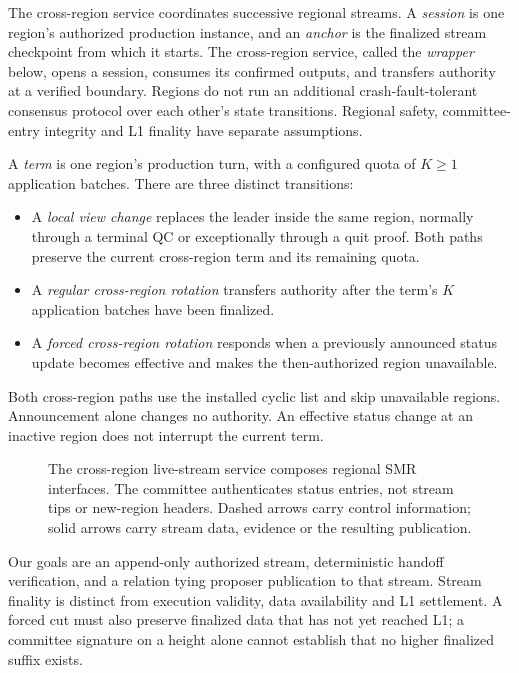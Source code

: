 \documentclass[11pt,a4paper,onecolumn]{article}
\newcounter{protocol}
\begin{document}
The cross-region service coordinates successive regional streams. A
\emph{session} is one region's authorized production instance, and an
\emph{anchor} is the finalized stream checkpoint from which it starts.
The cross-region service, called the \emph{wrapper} below, opens a session,
consumes its confirmed outputs, and transfers authority at a verified
boundary. Regions
do not run an additional crash-fault-tolerant consensus protocol over each
other's state transitions. Regional safety, committee-entry integrity and
L1 finality have separate assumptions.

A \emph{term} is one region's production turn, with a configured quota
of $K\geq1$ application batches. There are three distinct transitions:
\begin{itemize}
\item A \emph{local view change} replaces the leader inside the same region,
normally through a terminal QC or exceptionally through a quit proof.
Both paths preserve the current cross-region term and its remaining quota.
\item A \emph{regular cross-region rotation} transfers authority after
the term's $K$ application batches have been finalized.
\item A \emph{forced cross-region rotation} responds when a previously
announced status update becomes effective and makes the then-authorized
region unavailable.
\end{itemize}
Both cross-region paths use the installed cyclic list and skip unavailable
regions. Announcement alone changes no authority. An effective status
change at an inactive region does not interrupt the current term.

\begin{figure}[htbp]\centering

\caption{The cross-region live-stream service composes regional SMR
interfaces. The committee authenticates status entries, not stream tips or
new-region headers. Dashed arrows carry control information; solid arrows
carry stream data, evidence or the resulting publication.}
\label{fig:architecture}
\end{figure}

Our goals are an append-only authorized stream, deterministic handoff
verification, and a relation tying proposer publication to that stream.
Stream finality is distinct from execution validity, data availability
and L1 settlement. A forced cut must also preserve finalized data that has
not yet reached L1; a committee signature on a height alone cannot establish
that no higher finalized suffix exists.
\end{document}
